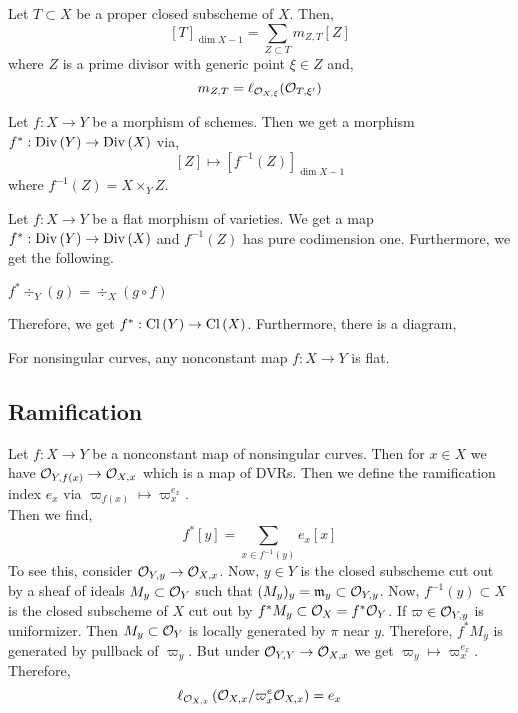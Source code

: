 \documentclass[12pt]{article}
\begin{document}
\begin{defn}
Let $T \subset X$ be a proper closed subscheme of $X$. Then,
\[ [T]_{\dim{X} - 1} = \sum_{Z \subset T} m_{Z, T} [Z] \]
where $Z$ is a prime divisor with generic point $\xi \in Z$ and,
\[ m_{Z, T} = \ell_{\mathcal{O}_{X, \xi}}(\mathcal{O}_{T, \xi'}) \]
\end{defn}

\begin{defn}
Let $f : X \to Y$ be a morphism of schemes. Then we get a morphism $f^* : \mathrm{Div}\left( Y \right) \to \mathrm{Div}\left( X \right)$ via,
\[ [Z] \mapsto [f^{-1}(Z)]_{\dim{X} - 1} \]
where $f^{-1}(Z) = X \times_Y Z$.
\end{defn}

Let $f : X \to Y$ be a flat morphism of varieties. We get a map $f^* : \mathrm{Div}\left( Y \right) \to \mathrm{Div}\left( X \right)$ and $f^{-1}(Z)$ has pure codimension one. Furthermore, we get the following.

\begin{prop}
$f^* \div_Y(g) = \div_X(g \circ f)$
\end{prop}
\noindent
Therefore, we get $f^* : \mathrm{Cl} \left( Y \right) \to \mathrm{Cl} \left( X \right)$. Furthermore, there is a diagram,
\begin{center}
\end{center}

\begin{example}
For nonsingular curves, any nonconstant map $f : X \to Y$ is flat.
\end{example}

\subsection{Ramification}

Let $f : X \to Y$ be a nonconstant map of nonsingular curves. Then for $x \in X$ we have $\mathcal{O}_{Y, f(x)} \to \mathcal{O}_{X, x}$ which is a map of DVRs. Then we define the ramification index $e_x$ via $\varpi_{f(x)} \mapsto \varpi_x^{e_x}$. 
\bigskip\\
Then we find,
\[ f^* [y] = \sum_{x \in f^{-1}(y)} e_x [x] \]
To see this, consider $\mathcal{O}_{Y, y} \to \mathcal{O}_{X, x}$. Now, $y \in Y$ is the closed subscheme cut out by a sheaf of ideals $M_y \subset \mathcal{O}_{Y}$ such that $(M_y)_y = \mathfrak{m}_y \subset \mathcal{O}_{Y, y}$. Now, $f^{-1}(y) \subset X$ is the closed subscheme of $X$ cut out by $f^* M_y \subset \mathcal{O}_{X} = f^* \mathcal{O}_{Y}$. If $\varpi \in \mathcal{O}_{Y, y}$ is uniformizer. Then $M_y \subset \mathcal{O}_{Y}$ is locally generated by $\pi$ near $y$. Therefore, $f^* M_y$ is generated by pullback of $\varpi_y$. But under $\mathcal{O}_{Y, Y} \to \mathcal{O}_{X, x}$ we get $\varpi_y \mapsto \varpi_x^{e_x}$.
Therefore,
\[ \ell_{\mathcal{O}_{X, x}} \left( \mathcal{O}_{X, x} / \varpi_x^e \mathcal{O}_{X, x} \right) = e_x \] 
\end{document}
